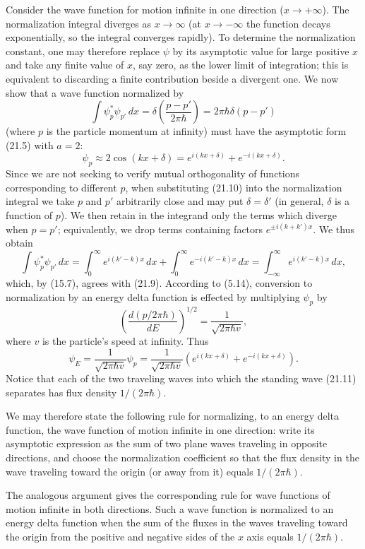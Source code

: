 Consider the wave function for motion infinite in one direction
($x\to+\infty$). The normalization integral diverges as $x\to\infty$ (at
$x\to-\infty$ the function decays exponentially, so the integral converges
rapidly). To determine the normalization constant, one may therefore replace
$\psi$ by its asymptotic value for large positive $x$ and take any finite
value of $x$, say zero, as the lower limit of integration; this is equivalent
to discarding a finite contribution beside a divergent one. We now
show that a wave function normalized by
\begin{equation}
  \int\psi_p^*\psi_{p'}\,dx
  =\delta\left(\frac{p-p'}{2\pi\hbar}\right)
  =2\pi\hbar\delta(p-p')
  \tag{21.9}
\end{equation}
(where $p$ is the particle momentum at infinity) must have the asymptotic form
(21.5) with $a=2$:
\begin{equation}
  \psi_p\approx2\cos(kx+\delta)
  =e^{i(kx+\delta)}+e^{-i(kx+\delta)}.
  \tag{21.10}
\end{equation}
Since we are not seeking to verify mutual orthogonality of functions
corresponding to different $p$, when substituting (21.10) into the
normalization integral we take $p$ and $p'$ arbitrarily close and may put
$\delta=\delta'$ (in general, $\delta$ is a function of $p$). We then retain
in the integrand only the terms which diverge when $p=p'$; equivalently, we
drop terms containing factors $e^{\pm i(k+k')x}$. We thus obtain
\[
  \int\psi_p^*\psi_{p'}\,dx
  =\int_0^\infty e^{i(k'-k)x}\,dx
  +\int_0^\infty e^{-i(k'-k)x}\,dx
  =\int_{-\infty}^\infty e^{i(k'-k)x}\,dx,
\]
which, by (15.7), agrees with (21.9).
According to (5.14), conversion to normalization by an energy delta function
is effected by multiplying $\psi_p$ by
\[
  {\left(\frac{d(p/2\pi\hbar)}{dE}\right)}^{1/2}
  =\frac{1}{\sqrt{2\pi\hbar v}},
\]
where $v$ is the particle's speed at infinity. Thus
\begin{equation}
  \psi_E=\frac{1}{\sqrt{2\pi\hbar v}}\psi_p
  =\frac{1}{\sqrt{2\pi\hbar v}}
  \left(e^{i(kx+\delta)}+e^{-i(kx+\delta)}\right).
  \tag{21.11}
\end{equation}
Notice that each of the two traveling waves into which the standing wave
(21.11) separates has flux density $1/(2\pi\hbar)$.

We may therefore state the following rule for normalizing, to an energy delta
function, the wave function of motion infinite in one direction: write its
asymptotic expression as the sum of two plane waves traveling in opposite
directions, and choose the normalization coefficient so that the flux density
in the wave traveling toward the origin (or away from it) equals
$1/(2\pi\hbar)$.

The analogous argument gives the corresponding rule for wave functions of
motion infinite in both directions. Such a wave function is normalized to an
energy delta function when the sum of the fluxes in the waves traveling
toward the origin from the positive and negative sides of the $x$ axis equals
$1/(2\pi\hbar)$.
